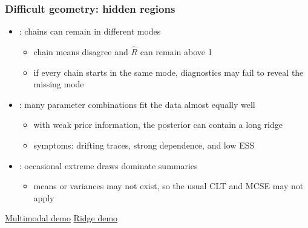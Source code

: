 \documentclass[10pt]{beamer}
\begin{document}
\begin{frame}

\frametitle{Difficult geometry: hidden regions}

  \begin{itemize}
  \item {}: chains can remain in different modes
    \begin{itemize}
    \item chain means disagree and $\widehat R$ can remain above 1
    \item if every chain starts in the same mode, diagnostics may fail to
      reveal the missing mode
    \end{itemize}
  \pause
  \item {}: many parameter combinations fit the
    data almost equally well
    \begin{itemize}
    \item with weak prior information, the posterior can contain a long ridge
    \item symptoms: drifting traces, strong dependence, and low ESS
    \end{itemize}
  \pause
  \item {}: occasional extreme draws dominate summaries
    \begin{itemize}
    \item means or variances may not exist, so the usual CLT and MCSE may
      not apply
    \end{itemize}
  \end{itemize}

  \vfill
  \centering
  \href{https://chi-feng.github.io/mcmc-demo/app.html?algorithm=RandomWalkMH&target=multimodal}{Multimodal demo}
  \qquad
  \href{https://chi-feng.github.io/mcmc-demo/app.html?algorithm=RandomWalkMH&target=donut}{Ridge demo}

\end{frame}
\end{document}
